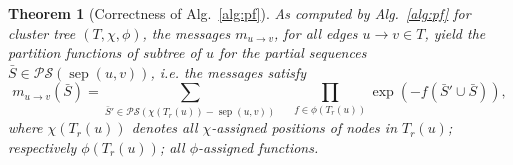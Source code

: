 \documentclass[10pt]{article}
\newtheorem{theorem}{Theorem}
\newcommand{\val}{\bar S} %
\newcommand{\separator}[2]{\operatorname{sep}(#1,#2)}
\newcommand{\Message}[2]{m_{#1\rightarrow #2}}
\newcommand{\partseqs}{\mathcal{P\!S}}
\newcommand{\evalfor}[2]{#1(#2)}
\newcommand{\substitute}[2]{#1\cup#2}
\begin{document}
    \begin{theorem}[Correctness of Alg.~\ref{alg:pf}]
      \label{the:pfalgo-correctness}
      As computed by Alg.~\ref{alg:pf} for cluster tree $(T,\chi,\phi)$,
      the messages $\Message{u}{v}$, for all edges $u\to{}v\in T$, yield
      the partition functions of subtree of $u$ for the partial sequences
      $\val\in\partseqs(\separator{u}{v})$, i.e. the messages satisfy
      \begin{equation}
       \evalfor{\Message{u}{v}}{\val} = \sum_{\val'\in\partseqs(\chi(T_r(u))-\separator{u}{v})} \quad
       \prod_{f\in\phi(T_r(u))} \exp(-\evalfor{f}{\substitute{\val'}{\val}}),\label{eq:pfalgo-correct}
     \end{equation}
     where $\chi(T_r(u))$ denotes all $\chi$-assigned positions of nodes in $T_r(u)$;
     respectively $\phi(T_r(u))$; all $\phi$-assigned functions.
    \end{theorem}
\end{document}
